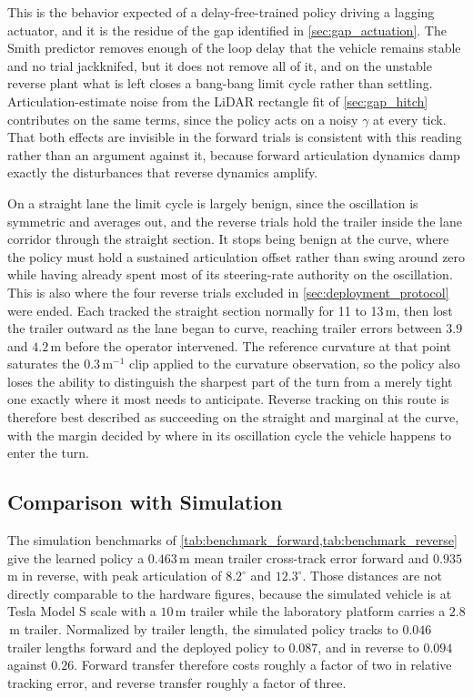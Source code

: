 This is the behavior expected of a delay-free-trained policy driving a lagging actuator, and it is the residue of the gap identified in \cref{sec:gap_actuation}. The Smith predictor removes enough of the loop delay that the vehicle remains stable and no trial jackknifed, but it does not remove all of it, and on the unstable reverse plant what is left closes a bang-bang limit cycle rather than settling. Articulation-estimate noise from the LiDAR rectangle fit of \cref{sec:gap_hitch} contributes on the same terms, since the policy acts on a noisy $\gamma$ at every tick. That both effects are invisible in the forward trials is consistent with this reading rather than an argument against it, because forward articulation dynamics damp exactly the disturbances that reverse dynamics amplify.

On a straight lane the limit cycle is largely benign, since the oscillation is symmetric and averages out, and the reverse trials hold the trailer inside the lane corridor through the straight section. It stops being benign at the curve, where the policy must hold a sustained articulation offset rather than swing around zero while having already spent most of its steering-rate authority on the oscillation. This is also where the four reverse trials excluded in \cref{sec:deployment_protocol} were ended. Each tracked the straight section normally for 11 to 13\,m, then lost the trailer outward as the lane began to curve, reaching trailer errors between $3.9$ and $4.2$\,m before the operator intervened. The reference curvature at that point saturates the $0.3$\,m$^{-1}$ clip applied to the curvature observation, so the policy also loses the ability to distinguish the sharpest part of the turn from a merely tight one exactly where it most needs to anticipate. Reverse tracking on this route is therefore best described as succeeding on the straight and marginal at the curve, with the margin decided by where in its oscillation cycle the vehicle happens to enter the turn.

\subsection{Comparison with Simulation}

The simulation benchmarks of \cref{tab:benchmark_forward,tab:benchmark_reverse} give the learned policy a $0.463$\,m mean trailer cross-track error forward and $0.935$\,m in reverse, with peak articulation of $8.2^\circ$ and $12.3^\circ$. Those distances are not directly comparable to the hardware figures, because the simulated vehicle is at Tesla Model S scale with a $10$\,m trailer while the laboratory platform carries a $2.8$\,m trailer. Normalized by trailer length, the simulated policy tracks to $0.046$ trailer lengths forward and the deployed policy to $0.087$, and in reverse to $0.094$ against $0.26$. Forward transfer therefore costs roughly a factor of two in relative tracking error, and reverse transfer roughly a factor of three.

